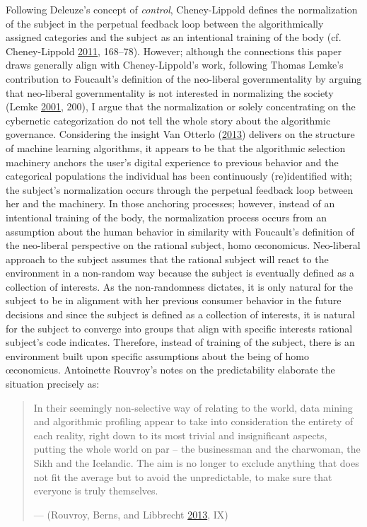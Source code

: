 \documentclass[12pt,twoside]{report}
\begin{document}
Following Deleuze's concept of \emph{control}, Cheney-Lippold defines the normalization of the subject in the perpetual feedback loop between the algorithmically assigned categories and the subject as an intentional training of the body (cf. Cheney-Lippold \protect\hyperlink{ref-Cheney2011}{2011}, 168--78). However; although the connections this paper draws generally align with Cheney-Lippold's work, following Thomas Lemke's contribution to Foucault's definition of the neo-liberal governmentality by arguing that neo-liberal governmentality is not interested in normalizing the society (Lemke \protect\hyperlink{ref-Lemke2001}{2001}, 200), I argue that the normalization or solely concentrating on the cybernetic categorization do not tell the whole story about the algorithmic governance. Considering the insight Van Otterlo (\protect\hyperlink{ref-Otterlo2013}{2013}) delivers on the structure of machine learning algorithms, it appears to be that the algorithmic selection machinery anchors the user's digital experience to previous behavior and the categorical populations the individual has been continuously (re)identified with; the subject's normalization occurs through the perpetual feedback loop between her and the machinery. In those anchoring processes; however, instead of an intentional training of the body, the normalization process occurs from an assumption about the human behavior in similarity with Foucault's definition of the neo-liberal perspective on the rational subject, homo œconomicus. Neo-liberal approach to the subject assumes that the rational subject will react to the environment in a non-random way because the subject is eventually defined as a collection of interests. As the non-randomness dictates, it is only natural for the subject to be in alignment with her previous consumer behavior in the future decisions and since the subject is defined as a collection of interests, it is natural for the subject to converge into groups that align with specific interests rational subject's code indicates. Therefore, instead of training of the subject, there is an environment built upon specific assumptions about the being of homo œconomicus. Antoinette Rouvroy's notes on the predictability elaborate the situation precisely as:

\begin{quote}
In their seemingly non-selective way of relating to the world, data mining and algorithmic profiling appear to take into consideration the entirety of each reality, right down to its most trivial and insignificant aspects, putting the whole world on par -- the businessman and the charwoman, the Sikh and the Icelandic. The aim is no longer to exclude anything that does not fit the average but to avoid the unpredictable, to make sure that everyone is truly themselves.

--- (Rouvroy, Berns, and Libbrecht \protect\hyperlink{ref-Rouvroy2013}{2013}, IX)
\end{quote}
\end{document}
